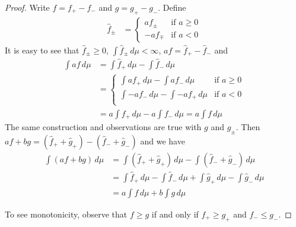 \documentclass{amsart}
\theoremstyle{remark}
\theoremstyle{definition}
\begin{document}
\begin{proof}
Write $f = f_+ - f_-$ and $g = g_+ - g_-$.  Define 
\begin{align*}
\hat{f}_\pm &= \begin{cases}
a f_\pm & \text{if $a  \geq 0$} \\
-a f_\mp & \text{if $a < 0$}
\end{cases}
\end{align*} 
It is easy to see that $\hat{f}_\pm \geq 0$,
$\int \hat{f}_\pm \, d\mu < \infty$,  $a f = \hat{f}_+ - \hat{f}_-$
and
\begin{align*}
\int af \, d\mu &= \int \hat{f}_+ \, d\mu - \int \hat{f}_- \, d\mu\\
&= \begin{cases}
\int a f_+ \, d\mu - \int af_- \, d\mu & \text{if $a \geq 0$} \\
\int -a f_- \, d\mu - \int -af_+ \, d\mu & \text{if $a < 0$} \\
\end{cases}\\
&= a \int f_+ \, d\mu - a \int f_- \, d\mu = a \int f\, d\mu
\end{align*}  
The same construction and
observations are true with $g$ and $\hat{g}_\pm$.
Then $a f + b g = (\hat{f}_+ + \hat{g}_+) - (\hat{f}_- + \hat{g}_-)$
and we have
\begin{align*}
\int (a f + b g) \, d\mu &= \int (\hat{f}_+ + \hat{g}_+) \, d\mu -
\int (\hat{f}_- + \hat{g}_-) \, d\mu \\
&= \int \hat{f}_+ \, d\mu - \int \hat{f}_- \, d\mu + \int \hat{g}_+ \, d\mu -
\int \hat{g}_- \, d\mu \\
&= a \int f \, d\mu + b \int g \, d\mu
\end{align*}

To see monotonicity, observe that $f \geq g$ if and only if $f_+ \geq
g_+$ and $f_- \leq g_-$.
\end{proof}
\end{document}
